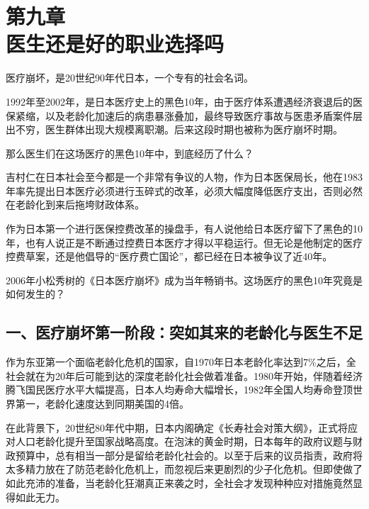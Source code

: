 

\section[第九章\q 医生还是好的职业选择吗]{第九章\\ 医生还是好的职业选择吗}


{\fangsong 医疗崩坏，是20世纪90年代日本，一个专有的社会名词。\par}

{\fangsong 1992年至2002年，是日本医疗史上的黑色10年，由于医疗体系遭遇经济衰退后的医保紧缩，以及老龄化加速后的病患暴涨叠加，最终导致医疗事故与医患矛盾案件层出不穷，医生群体出现大规模离职潮。后来这段时期也被称为医疗崩坏时期。\par}

{\fangsong 那么医生们在这场医疗的黑色10年中，到底经历了什么？\par}

吉村仁在日本社会至今都是一个非常有争议的人物，作为日本医保局长，他在1983年率先提出日本医疗必须进行玉碎式的改革，必须大幅度降低医疗支出，否则必然在老龄化到来后拖垮财政体系。

作为日本第一个进行医保控费改革的操盘手，有人说他给日本医疗留下了黑色的10年，也有人说正是不断通过控费日本医疗才得以平稳运行。但无论是他制定的医疗控费草案，还是他倡导的“医疗费亡国论”，都已经在日本被争议了近40年。

2006年小松秀树的《日本医疗崩坏》成为当年畅销书。这场医疗的黑色10年究竟是如何发生的？

\subsection{一、医疗崩坏第一阶段：突如其来的老龄化与医生不足}

作为东亚第一个面临老龄化危机的国家，自1970年日本老龄化率达到7\%之后，全社会就在为20年后可能到达的深度老龄化社会做着准备。1980年开始，伴随着经济腾飞国民医疗水平大幅提高，日本人均寿命大幅增长，1982年全国人均寿命登顶世界第一，老龄化速度达到同期美国的4倍。

在此背景下，20世纪80年代中期，日本内阁确定《长寿社会对策大纲》，正式将应对人口老龄化提升至国家战略高度。在泡沫的黄金时期，日本每年的政府议题与财政预算中，总有相当一部分是留给老龄化社会的。以至于后来的议员指责，政府将太多精力放在了防范老龄化危机上，而忽视后来更剧烈的少子化危机。但即使做了如此充沛的准备，当老龄化狂潮真正来袭之时，全社会才发现种种应对措施竟然显得如此无力。

